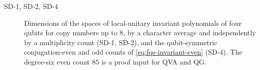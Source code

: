 \begin{description}
\item[SD-1, SD-2, SD-4] Dimensions of the spaces of local-unitary invariant polynomials of four qubits
for copy numbers up to $8$, by a character average and independently by a multiplicity count (SD-1, SD-2),
and the qubit-symmetric conjugation-even and odd counts of \eqref{eq:fqe-invariant-even} (SD-4). The degree-six
even count $85$ is a proof input for QVA and QG.

\end{description}


